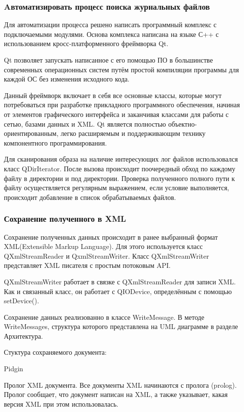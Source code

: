 \subsubsection{Aвтоматизировать процесс поиска журнальных файлов}

Для автоматизации процесса решено написать программный комплекс с подключаемыми модулями. Основа комплекса написана на языке С++ с использованием кросс-платформенного фреймворка Qt.

Qt позволяет запускать написанное с его помощью ПО в большинстве современных операционных систем путём простой компиляции программы для каждой ОС без изменения исходного кода.

Данный фреймворк включает в себя все основные классы, которые могут потребоваться при разработке прикладного программного обеспечения, начиная от элементов графического интерфейса и заканчивая классами для работы с сетью, базами данных и XML. Qt является полностью объектно-ориентированным, легко расширяемым и поддерживающим технику компонентного программирования.

Для сканирования образа на наличие интересующих лог файлов использовался класс QDirIterator. После вызова происходит поочередный обход по каждому файлу в директории и под директории. Проверка полученного полного пути к файлу осуществляется регулярным выражением, если условие выполняется, происходит добавление в список обрабатываемых файлов. 

\subsubsection{Сохранение полученного в XML}

Сохранение полученных данных происходит в ранее выбранный формат XML(Extensible Markup Language). Для этого используется класс QXmlStreamReader и QxmlStreamWriter.
Класс QXmlStreamWriter представляет XML писателя с простым потоковым API.

QXmlStreamWriter работает в связке с QXmlStreamReader для записи XML. Как и связанный класс, он работает с QIODevice, определённым с помощью setDevice().

Сохранение данных реализованно в классе WriteMessage. В методе WriteMessages, структура которого представлена на UML диаграмме в разделе Архитектура. %

Стуктура сохраняемого документа:

Pidgin

Пролог XML документа. Все документы XML начинаются с пролога (prolog). Пролог сообщает, что документ написан на XML, а также указывает, какая версия XML при этом использовалась.  

